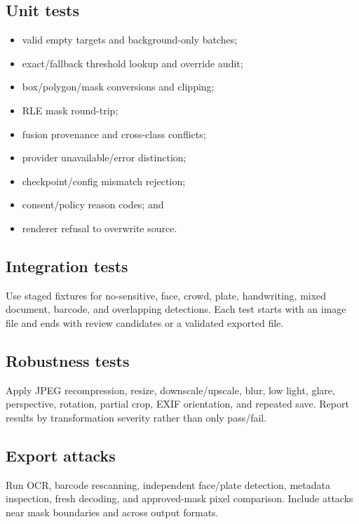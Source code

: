 \subsection{Unit tests}

\begin{itemize}[leftmargin=6mm]
  \item valid empty targets and background-only batches;
  \item exact/fallback threshold lookup and override audit;
  \item box/polygon/mask conversions and clipping;
  \item RLE mask round-trip;
  \item fusion provenance and cross-class conflicts;
  \item provider unavailable/error distinction;
  \item checkpoint/config mismatch rejection;
  \item consent/policy reason codes; and
  \item renderer refusal to overwrite source.
\end{itemize}

\subsection{Integration tests}

Use staged fixtures for no-sensitive, face, crowd, plate, handwriting, mixed document, barcode, and overlapping detections. Each test starts with an image file and ends with review candidates or a validated exported file.

\subsection{Robustness tests}

Apply JPEG recompression, resize, downscale/upscale, blur, low light, glare, perspective, rotation, partial crop, EXIF orientation, and repeated save. Report results by transformation severity rather than only pass/fail.

\subsection{Export attacks}

Run OCR, barcode rescanning, independent face/plate detection, metadata inspection, fresh decoding, and approved-mask pixel comparison. Include attacks near mask boundaries and across output formats.

